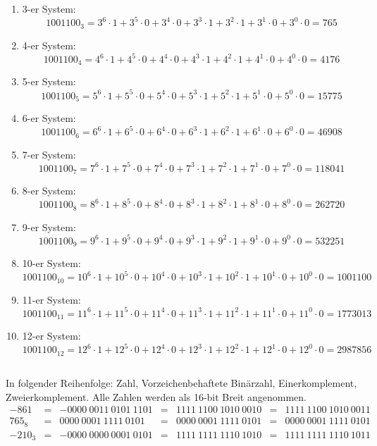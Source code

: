 \documentclass[DIN, pagenumber=false, fontsize=11pt, parskip=half]{scrartcl}
\newcommand{\bullshit}[2]{#1-er System:
            \begin{equation*}
                {1001100}_{#1} = #1^6 \cdot 1 + #1^5 \cdot 0 + #1^4 \cdot 0 + #1^3 \cdot 1 + #1^2 \cdot 1 +  #1^1 \cdot 0 + #1^0 \cdot  0 = #2
            \end{equation*}
            }
\begin{document}
    \subsection{}
    \begin{enumerate}[label = (\alph*)]
        \item \bullshit{3}{765}
        \item \bullshit{4}{4176}
        \item \bullshit{5}{15775}
        \item \bullshit{6}{46908}
        \item \bullshit{7}{118041}
        \item \bullshit{8}{262720}
        \item \bullshit{9}{532251}
        \item \bullshit{10}{1001100}
        \item \bullshit{11}{1773013}
        \item \bullshit{12}{2987856}
    \end{enumerate}
    \subsection{}
    In folgender Reihenfolge: Zahl, Vorzeichenbehaftete Binärzahl, Einerkomplement, Zweierkomplement. Alle Zahlen werden als 16-bit Breit angenommen.
    \begin{align*}
        -861 &=& -0000\ 0011\ 0101\ 1101 &=& 1111\ 1100\ 1010\ 0010 &=& 1111\ 1100\ 1010\ 0011\\
        {765}_8 &=& 0000\ 0001\ 1111\ 0101 &=& 0000\ 0001\ 1111\ 0101 &=& 0000\ 0001\ 1111\ 0101 \\ 
        -{210}_3 &=&- 0000\ 0000\ 0001\ 0101 &=& 1111\ 1111\ 1110\ 1010 &=& 1111\ 1111\ 1110\ 1011
    \end{align*}
    
\end{document}
